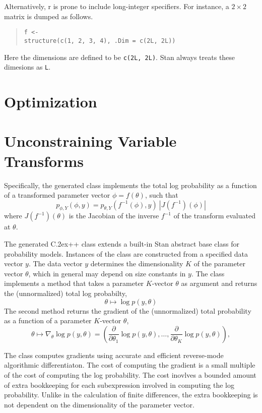 \documentclass[10pt]{report}
\newcommand{\Stan}{Stan\xspace}
\newcommand*{\Cpp}{C\raise.2ex\hbox{\footnotesize ++}\xspace} %
\newcommand{\acronym}[1]{{\sc #1}\xspace}
\newcommand{\R}{\acronym{r}}
\newcommand{\code}[1]{{\tt #1}}
\begin{document}
Alternatively, \R is prone to include long-integer specifiers.
For instance, a $2 \times 2$ matrix is dumped as follows.
%
\begin{quote}
\begin{Verbatim}
f <-
structure(c(1, 2, 3, 4), .Dim = c(2L, 2L))
\end{Verbatim}
\end{quote}
%
Here the dimensions are defined to be \code{c(2L,~2L)}.  \Stan 
always treats these dimesions as \code{L}.




\chapter{Optimization}\label{optimization.chapter}

\chapter{Unconstraining Variable Transforms}

Specifically, the generated class implements the total log 
probability as a function of a transformed parameter 
vector $\phi = f(\theta)$, such that
\[ 
p_{\phi,Y}(\phi,y) 
= p_{\theta,Y}(f^{-1}(\phi),y) \ \left| J(f^{-1})(\phi) \right|
\] 
where $J(f^{-1})(\theta)$ is the Jacobian of the inverse $f^{-1}$ of 
the transform evaluated at $\theta$.
 
The generated \Cpp class extends a built-in \Stan abstract
base class for probability models.  Instances of the class are
constructed from a specified data vector $y$.  The data vector $y$
determines the dimensionality $K$ of the parameter vector $\theta$,
which in general may depend on size constants in $y$.  The class
implements a method that takes a parameter $K$-vector $\theta$ as
argument and returns the (unnormalized) total log probabilty,
\[
\theta 
\mapsto 
\log p(y,\theta) 
\]
The second method returns the gradient of the (unnormalized) total
probability as a function of a parameter $K$-vector $\theta$,
\[
\theta
\mapsto
\nabla_{\theta} \log p(y,\theta)
= ( \frac{\partial}{\partial\theta_1} \log p(y,\theta),
    \ldots, 
    \frac{\partial}{\partial\theta_K} \log p(y,\theta) ),
\]

The class computes gradients using accurate and efficient reverse-mode
algorithmic differentiaton.  The cost of computing the gradient is
a small multiple of the cost of computing the log probability.  The
cost inovlves a bounded amount of extra bookkeeping for each 
subexpression involved in computing the log probability.  Unlike
in the calculation of finite differences, the extra bookkeeping is
not dependent on the dimensionality of the parameter vector.
\end{document}
